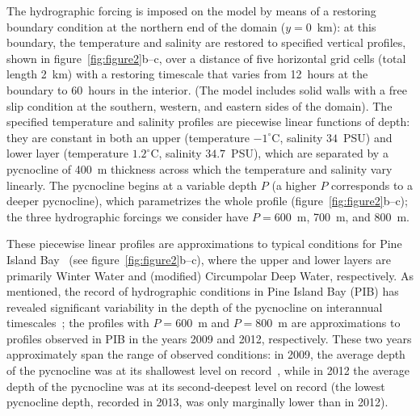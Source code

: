 \documentclass[draft]{agujournal2019}
\begin{document}
The hydrographic forcing is imposed on the model by means of a restoring boundary condition at the northern end of the domain ($y = 0$~km): at this boundary, the temperature and salinity are restored to specified vertical profiles, shown in figure~\ref{fig:figure2}b--c, over a distance of five horizontal grid cells (total length 2 km) with a restoring timescale that varies from 12~hours at the boundary to 60~hours in the interior. (The model includes solid walls with a free slip condition at the southern, western, and eastern sides of the domain). The specified temperature and salinity profiles are piecewise linear functions of depth: they are constant in both an upper (temperature $-1^\circ$C, salinity $34$~PSU) and lower layer (temperature $1.2^\circ$C, salinity $34.7$~PSU), which are separated by a pycnocline of 400~m thickness across which the temperature and salinity vary linearly. The pycnocline begins at a variable depth $P$ (a higher $P$ corresponds to a deeper pycnocline), which parametrizes the whole profile (figure~\ref{fig:figure2}b--c); the three hydrographic forcings we consider have $P=600$ m, 700 m, and 800 m. 

These piecewise linear profiles are approximations to typical conditions for Pine Island Bay~\cite{Jacobs1996GRL, Dutrieux2014Science, Jenkins2018NatureGeo} (see figure~\ref{fig:figure2}b--c), where the upper and lower layers are primarily Winter Water and (modified) Circumpolar Deep Water, respectively. As mentioned, the record of hydrographic conditions in Pine Island Bay (PIB) has revealed significant variability in the depth of the pycnocline on interannual timescales~\cite{Dutrieux2014Science}; the profiles with $P=600$~m and $P=800$~m are approximations to profiles observed in PIB in the years 2009 and 2012, respectively. These two years approximately span the range of observed conditions: in 2009, the average depth of the pycnocline was at its shallowest level on record~\cite{Webber2017NatureComms}, while in 2012 the average depth of the pycnocline was at its second-deepest level on record (the lowest pycnocline depth, recorded in 2013, was only marginally lower than in 2012).
\end{document}

